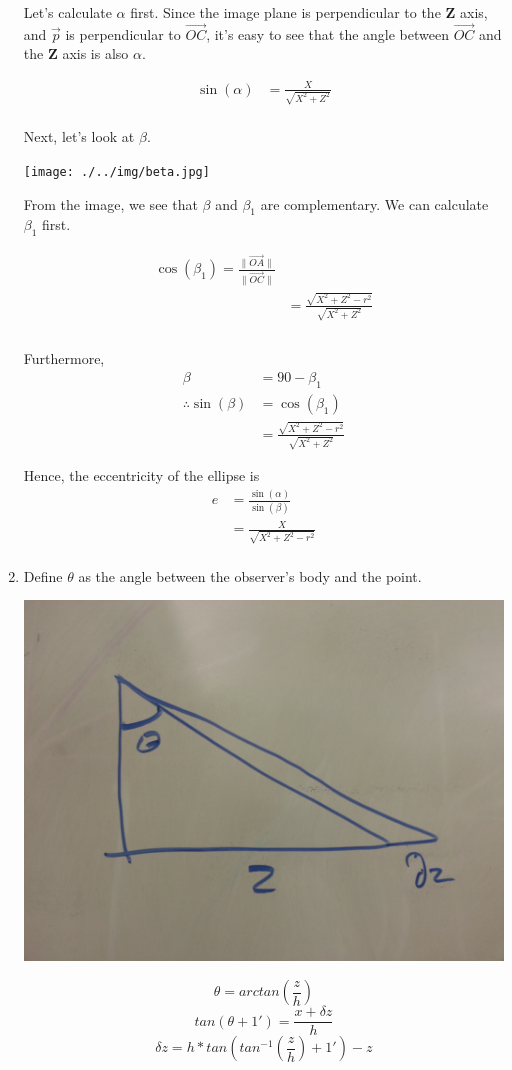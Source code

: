 \documentclass[11pt]{article}
\begin{document}
\begin{enumerate}
    Let's calculate $\alpha$ first. Since the image plane is perpendicular to the
    $\textbf{Z}$ axis, and $\vec{p}$ is perpendicular to $\vec{OC}$, it's easy to
    see that the angle between $\vec{OC}$ and the $\textbf{Z}$ axis is also
    $\alpha$. 

    \begin{align*}
        \sin(\alpha) &= \frac{X}{\sqrt{X^2 + Z^2}} \\
    \end{align*}

    Next, let's look at $\beta$.

    \texttt{[image: ./../img/beta.jpg]}

    From the image, we see that $\beta$ and $\beta_1$ are complementary. We can
    calculate $\beta_1$ first. 

    \begin{align*}
        \cos(\beta_1) = \frac{\|\vec{OA}\|}{\|\vec{OC}\|} \\
        &= \frac{\sqrt{X^2 + Z^2 - r^2}}{\sqrt{X^2 + Z^2}} \\
        \\
    \end{align*}

    Furthermore,
    \begin{align*}
        \beta &= 90 - \beta_1 \\
        \therefore \sin(\beta) &= \cos(\beta_1) \\
                               &= \frac{\sqrt{X^2 + Z^2 - r^2}}{\sqrt{X^2 + Z^2}}
    \end{align*}

    Hence, the eccentricity of the ellipse is
    \begin{align*}
        e &= \frac{\sin(\alpha)}{\sin(\beta)} \\
          &= \frac{X}{\sqrt{X^2 + Z^2 - r^2}} \\
    \end{align*}

\item
    Define $\theta$ as the angle between the observer's body and the point.

    \includegraphics[width=0.5\linewidth]{./../img/delta_z.jpg}

    $$\theta = arctan(\frac{z}{h})$$
    $$tan(\theta + 1') = \frac{x + \delta z}{h}$$
    $$\delta z = h*tan(tan^{-1}(\frac{z}{h}) + 1') - z$$
\end{enumerate}
\newpage
\end{document}
